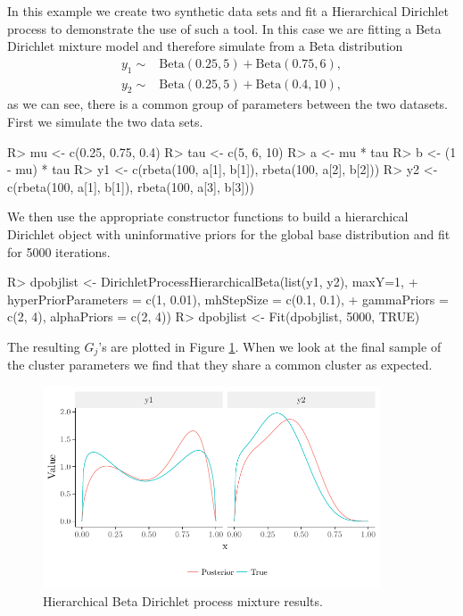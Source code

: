 \documentclass[nojss]{jss}
\begin{document}
In this example we create two synthetic data sets and fit a Hierarchical Dirichlet process to demonstrate the use of such a tool. In this case we are fitting a Beta Dirichlet mixture model and therefore simulate from a Beta distribution
\begin{align*}
y_1 \sim & \text{Beta}(0.25, 5) + \text{Beta}(0.75, 6), \\
y_2 \sim & \text{Beta}(0.25, 5) + \text{Beta}(0.4, 10),
\end{align*}
as we can see, there is a common group of parameters between the two datasets. First we simulate the two data sets.
\begin{Schunk}
\begin{Sinput}
R> mu <- c(0.25, 0.75, 0.4)
R> tau <- c(5, 6, 10)
R> a <- mu * tau
R> b <- (1 - mu) * tau
R> y1 <- c(rbeta(100, a[1], b[1]), rbeta(100, a[2], b[2]))
R> y2 <- c(rbeta(100, a[1], b[1]), rbeta(100, a[3], b[3]))
\end{Sinput}
\end{Schunk}
We then use the appropriate constructor functions to build a hierarchical Dirichlet object with uninformative priors for the global base distribution and fit for 5000 iterations.
\begin{Schunk}
\begin{Sinput}
R> dpobjlist <- DirichletProcessHierarchicalBeta(list(y1, y2), maxY=1,
+  hyperPriorParameters = c(1, 0.01), mhStepSize = c(0.1, 0.1),
+  gammaPriors = c(2, 4), alphaPriors = c(2, 4))
R> dpobjlist <- Fit(dpobjlist, 5000, TRUE)
\end{Sinput}
\end{Schunk}
The resulting $G_j$'s are plotted in Figure \ref{fig:hierBeta}. When we look at the final sample of the cluster parameters we find that they share a common cluster as expected.
\begin{figure}
\centering
\includegraphics[height=60mm, width=100mm]{img/hierBetaGraph.pdf}
\caption{Hierarchical Beta Dirichlet process mixture results.}
\label{fig:hierBeta}
\end{figure}
\end{document}
